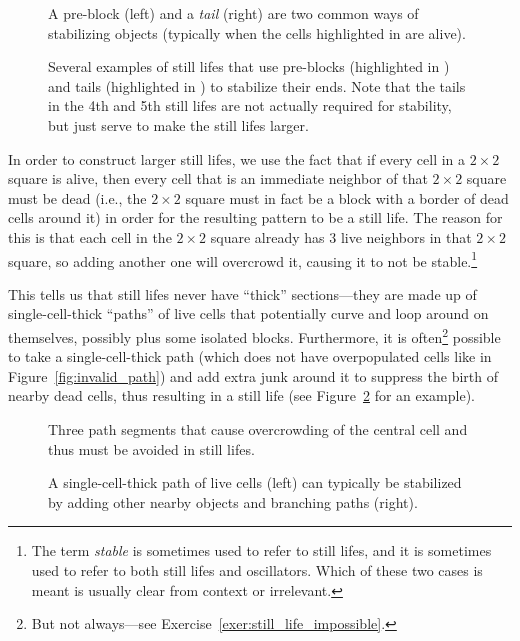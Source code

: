 \begin{figure}[!htb]
	\centering
	\begin{minipage}[b]{.31\textwidth}
		\centering
		\caption{A pre-block (left) and a \emph{tail} (right) are two common ways of stabilizing objects (typically when the cells highlighted in  are alive).}
		\label{fig:hook_tail}
	\end{minipage} \quad %
	\begin{minipage}[b]{.64\textwidth}
		\centering
		\caption{Several examples of still lifes that use pre-blocks (highlighted in ) and tails (highlighted in ) to stabilize their ends. Note that the tails in the 4th and 5th still lifes are not actually required for stability, but just serve to make the still lifes larger.}
		\label{fig:hook_tail_examples}
	\end{minipage}
\end{figure}

In order to construct larger still lifes, we use the fact that if every cell in a $2 \times 2$ square is alive, then every cell that is an immediate neighbor of that $2 \times 2$ square must be dead (i.e., the $2 \times 2$ square must in fact be a block with a border of dead cells around it) in order for the resulting pattern to be a still life. The reason for this is that each cell in the $2 \times 2$ square already has $3$ live neighbors in that $2 \times 2$ square, so adding another one will overcrowd it, causing it to not be stable.\footnote{The term \emph{stable} is sometimes used to refer to still lifes, and it is sometimes used to refer to both still lifes and oscillators. Which of these two cases is meant is usually clear from context or irrelevant.}

This tells us that still lifes never have ``thick'' sections---they are made up of single-cell-thick ``paths'' of live cells that potentially curve and loop around on themselves, possibly plus some isolated blocks. Furthermore, it is often\footnote{But not always---see Exercise~\ref{exer:still_life_impossible}.} possible to take a single-cell-thick path (which does not have overpopulated cells like in Figure~\ref{fig:invalid_path}) and add extra junk around it to suppress the birth of nearby dead cells, thus resulting in a still life (see Figure~\ref{fig:still_life_path} for an example).

\begin{figure}[!htb]
	\centering
	\begin{minipage}{.31\textwidth}
		\centering
		\caption{Three path segments that cause overcrowding of the central cell and thus must be avoided in still lifes.}
		\label{fig:invalid_path}
	\end{minipage} \quad %
	\begin{minipage}{.64\textwidth}
		\centering
		\caption{A single-cell-thick path of live cells (left) can typically be stabilized by adding other nearby objects and branching paths (right).}
		\label{fig:still_life_path}
	\end{minipage}
\end{figure}

